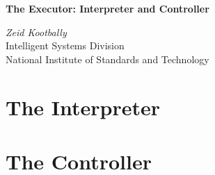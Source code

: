 \documentclass[12pt]{article}
\begin{document}
\begin{titlepage}
\begin{center}

\textbf{The Executor: Interpreter and Controller}\\

\vspace{1.5cm} %

\textit{Zeid Kootbally}\\
Intelligent Systems Division\\
National Institute of Standards and Technology
                                                                                                                                                             \\

\end{center}
\end{titlepage}
\cleardoublepage

\tableofcontents
\cleardoublepage
{}
\listoffigures
\cleardoublepage
\section{The Interpreter}
\label{s:interpreter}


 \section{The Controller}
 \label{s:controller}
 
\end{document}
